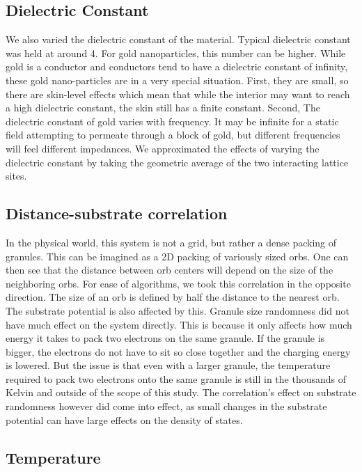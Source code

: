 \subsection{Dielectric Constant}
We also varied the dielectric constant of the material. Typical dielectric constant was held at around 4. For gold nanoparticles, this number can be higher. While gold is a conductor and conductors tend to have a dielectric constant of infinity, these gold nano-particles are in a very special situation. First, they are small, so there are skin-level effects which mean that while the interior may want to reach a high dielectric constant, the skin still has a finite constant. Second, The dielectric constant of gold varies with frequency. It may be infinite for a static field attempting to permeate through a block of gold, but different frequencies will feel different impedances. We approximated the effects of varying the dielectric constant by taking the geometric average of the two interacting lattice sites. 

\subsection{Distance-substrate correlation}
In the physical world, this system is not a grid, but rather a dense packing of granules. This can be imagined as a 2D packing of variously sized orbs. One can then see that the distance between orb centers will depend on the size of the neighboring orbs. For ease of algorithms, we took this correlation in the opposite direction. The size of an orb is defined by half the distance to the nearest orb. The substrate potential is also affected by this. Granule size randomness did not have much effect on the system directly. This is because it only affects how much energy it takes to pack two electrons on the same granule. If the granule is bigger, the electrons do not have to sit so close together and the charging energy is lowered. But the issue is that even with a larger granule, the temperature required to pack two electrons onto the same granule is still in the thousands of Kelvin and outside of the scope of this study. The correlation's effect on substrate randomness however did come into effect, as small changes in the substrate potential can have large effects on the density of states.


\subsection{Temperature}

